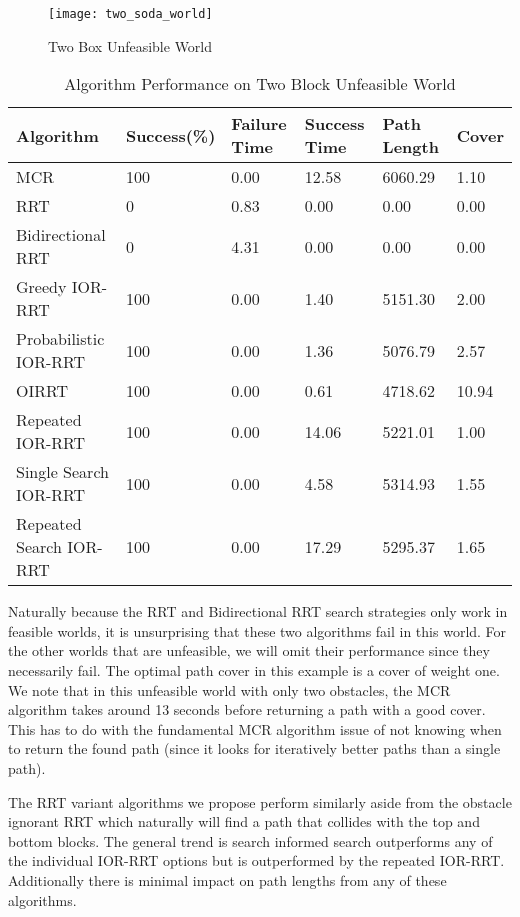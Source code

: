 \begin{figure}[h!]
    \centering
    \texttt{[image: two\_soda\_world]}
    \caption{Two Box Unfeasible World}
    \label{fig:two_soda_world}
\end{figure}

\begin{table}[h!]
\begin{tabular}{@{}llllll@{}}
\toprule
Algorithm & Success(\%)  & Failure Time  & Success Time  & Path Length & Cover\\ 
\midrule
MCR & 100 & 0.00 & 12.58 & 6060.29 & 1.10 \\
RRT & 0 & 0.83 & 0.00 & 0.00 & 0.00 \\
Bidirectional RRT & 0 & 4.31 & 0.00 & 0.00 & 0.00 \\
Greedy IOR-RRT & 100 & 0.00 & 1.40 & 5151.30 & 2.00 \\
Probabilistic IOR-RRT & 100 & 0.00 & 1.36 & 5076.79 & 2.57 \\
OIRRT & 100 & 0.00 & 0.61 & 4718.62 & 10.94 \\
Repeated IOR-RRT & 100 & 0.00 & 14.06 & 5221.01 & 1.00 \\
Single Search IOR-RRT & 100 & 0.00 & 4.58 & 5314.93 & 1.55 \\
Repeated Search IOR-RRT & 100 & 0.00 & 17.29 & 5295.37 & 1.65 \\
\bottomrule
\end{tabular}
\caption{Algorithm Performance on Two Block Unfeasible World}
\label{tab:two_soda_world}
\end{table}

Naturally because the RRT and Bidirectional RRT search strategies only work in feasible worlds, it is unsurprising that these two algorithms fail in this world. For the other worlds that are unfeasible, we will omit their performance since they necessarily fail. The optimal path cover in this example is a cover of weight one.  We note that in this unfeasible world with only two obstacles, the MCR algorithm takes around 13 seconds before returning a path with a good cover. This has to do with the fundamental MCR algorithm issue of not knowing when to return the found path (since it looks for iteratively better paths than a single path). 

The RRT variant algorithms we propose perform similarly aside from the obstacle ignorant RRT which naturally will find a path that collides with the top and bottom blocks. The general trend is search informed search outperforms any of the individual IOR-RRT options but is outperformed by the repeated IOR-RRT. Additionally there is minimal impact on path lengths from any of these algorithms.




